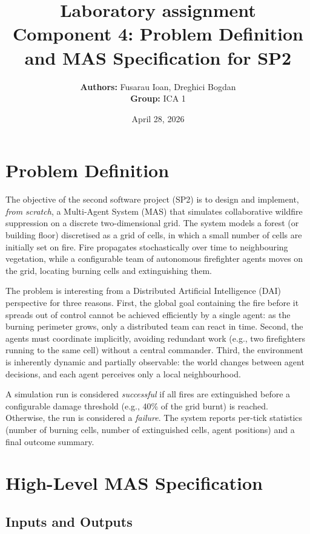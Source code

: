 \documentclass[a4paper, 11pt]{article}
\title{\textbf{Laboratory assignment} \\[1ex] \large \textbf{Component 4:} Problem Definition and MAS Specification for SP2}
\author{\textbf{Authors:} Fusarau Ioan, Dreghici Bogdan\\ \textbf{Group:} ICA 1}
\date{April 28, 2026}
\begin{document}
\maketitle

\section{Problem Definition}

The objective of the second software project (SP2) is to design and
implement, \emph{from scratch}, a Multi-Agent System (MAS) that simulates
collaborative wildfire suppression on a discrete two-dimensional grid.
The system models a forest (or building floor) discretised as a grid of
cells, in which a small number of cells are initially set on fire. Fire
propagates stochastically over time to neighbouring vegetation, while a
configurable team of autonomous firefighter agents moves on the grid,
locating burning cells and extinguishing them.

The problem is interesting from a Distributed Artificial Intelligence
(DAI) perspective for three reasons. First, the global goal containing
the fire before it spreads out of control cannot be achieved
efficiently by a single agent: as the burning perimeter grows, only a
distributed team can react in time. Second, the agents must coordinate
implicitly, avoiding redundant work (e.g., two firefighters running to the
same cell) without a central commander. Third, the environment is
inherently dynamic and partially observable: the world changes between
agent decisions, and each agent perceives only a local neighbourhood.

A simulation run is considered \emph{successful} if all fires are
extinguished before a configurable damage threshold (e.g., 40\% of the
grid burnt) is reached. Otherwise, the run is considered a \emph{failure}.
The system reports per-tick statistics (number of burning cells, number of
extinguished cells, agent positions) and a final outcome summary.

\section{High-Level MAS Specification}

\subsection{Inputs and Outputs}
\end{document}
